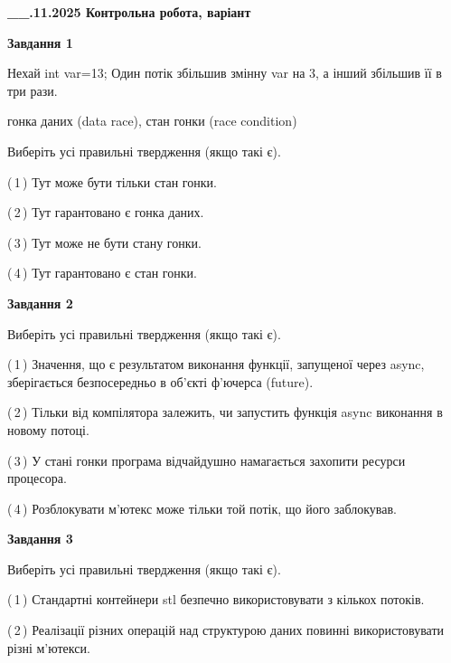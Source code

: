 \documentclass[12pt, ukrainian]{article}
\begin{document}
\begin {large}

\textbf{\_\_.11.2025 Контрольна робота, варіант  }\par


{

\begin{center}
\textbf{Завдання 1}
\end{center}
Нехай int var=13; Один потік збільшив змінну var на 3, а інший збільшив її в три рази.

гонка даних (data race), стан гонки (race condition)

Виберіть усі правильні твердження (якщо такі є).\par
\vspace{2mm}
(\,1\,) Тут може бути тільки стан гонки.%

(\,2\,) Тут гарантовано є гонка даних.%

(\,3\,) Тут може не бути стану гонки.%

(\,4\,) Тут гарантовано є стан гонки.%



\begin{center}
\textbf{Завдання 2}
\end{center}
Виберіть усі правильні твердження (якщо такі є).\par
\vspace{2mm}

(\,1\,) Значення, що є результатом виконання функції, запущеної через async, зберігається безпосередньо в об’єкті ф’ючерса (future).%

(\,2\,) Тільки від компілятора залежить, чи запустить функція async виконання в новому потоці.%

(\,3\,) У стані гонки програма відчайдушно намагається захопити ресурси процесора.%

(\,4\,) Розблокувати м’ютекс може тільки той потік, що його заблокував.%



\begin{center}
\textbf{Завдання 3}
\end{center}
Виберіть усі правильні твердження (якщо такі є).\par
\vspace{2mm}

(\,1\,) Стандартні контейнери stl безпечно використовувати з кількох потоків.%

(\,2\,) Реалізації різних операцій над структурою даних повинні використовувати різні м’ютекси.%

}
\end{large}
\end{document}
